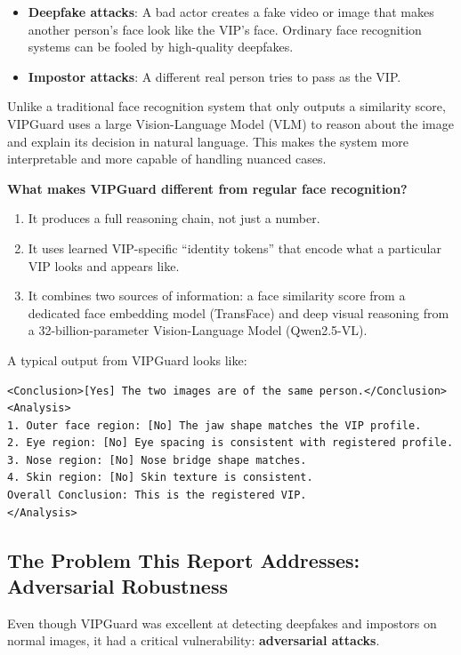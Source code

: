 \documentclass[12pt,a4paper]{article}
\begin{document}
\begin{itemize}
    \item \textbf{Deepfake attacks}: A bad actor creates a fake video or image that makes another person's face look like the VIP's face. Ordinary face recognition systems can be fooled by high-quality deepfakes.
    \item \textbf{Impostor attacks}: A different real person tries to pass as the VIP.
\end{itemize}

Unlike a traditional face recognition system that only outputs a similarity score, VIPGuard uses a large Vision-Language Model (VLM) to reason about the image and explain its decision in natural language. This makes the system more interpretable and more capable of handling nuanced cases.

\textbf{What makes VIPGuard different from regular face recognition?}

\begin{enumerate}
    \item It produces a full reasoning chain, not just a number.
    \item It uses learned VIP-specific ``identity tokens'' that encode what a particular VIP looks and appears like.
    \item It combines two sources of information: a face similarity score from a dedicated face embedding model (TransFace) and deep visual reasoning from a 32-billion-parameter Vision-Language Model (Qwen2.5-VL).
\end{enumerate}

A typical output from VIPGuard looks like:
\begin{lstlisting}[language={},caption={Example VIPGuard output},frame=single]
<Conclusion>[Yes] The two images are of the same person.</Conclusion>
<Analysis>
1. Outer face region: [No] The jaw shape matches the VIP profile.
2. Eye region: [No] Eye spacing is consistent with registered profile.
3. Nose region: [No] Nose bridge shape matches.
4. Skin region: [No] Skin texture is consistent.
Overall Conclusion: This is the registered VIP.
</Analysis>
\end{lstlisting}

\subsection{The Problem This Report Addresses: Adversarial Robustness}

Even though VIPGuard was excellent at detecting deepfakes and impostors on normal images, it had a critical vulnerability: \textbf{adversarial attacks}.
\end{document}

